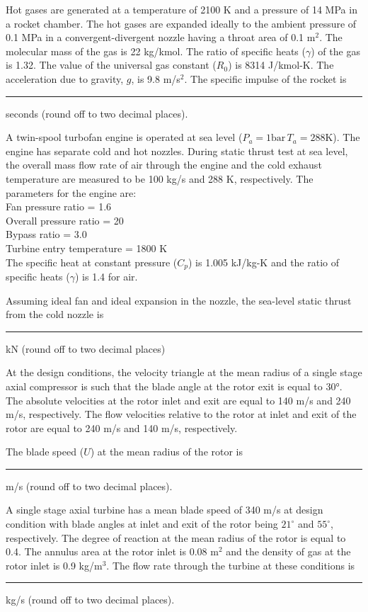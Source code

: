 \item Hot gases are generated at a temperature of 2100 K and a pressure of 14 MPa in a rocket chamber. The hot gases are expanded ideally to the ambient pressure of 0.1 MPa in a convergent-divergent nozzle having a throat area of 0.1 m$^2$. The molecular mass of the gas is 22 kg/kmol. The ratio of specific heats ($\gamma$) of the gas is 1.32. The value of the universal gas constant ($R_0$) is 8314 J/kmol-K. The acceleration due to gravity, $g$, is 9.8 m/s$^2$. The specific impulse of the rocket is \rule{1.5cm}{0.4pt} seconds (round off to two decimal places).

\item A twin-spool turbofan engine is operated at sea level ($P_a = 1 \text{bar}\, T_a = 288 \text{K}$). The engine has separate cold and hot nozzles. During static thrust test at sea level, the overall mass flow rate of air through the engine and the cold exhaust temperature are measured to be 100 kg/s and 288 K, respectively. The parameters for the engine are:\\
    Fan pressure ratio = 1.6\\
    Overall pressure ratio = 20\\
    Bypass ratio = 3.0\\
    Turbine entry temperature = 1800 K\\
The specific heat at constant pressure ($C_p$) is 1.005 kJ/kg-K and the ratio of specific heats ($\gamma$) is 1.4 for air.

Assuming ideal fan and ideal expansion in the nozzle, the sea-level static thrust from the cold nozzle is \rule{1.5cm}{0.4pt}kN (round off to two decimal places)

\item At the design conditions, the velocity triangle at the mean radius of a single stage axial compressor is such that the blade angle at the rotor exit is equal to 30°. The absolute velocities at the rotor inlet and exit are equal to 140 m/s and 240 m/s, respectively. The flow velocities relative to the rotor at inlet and exit of the rotor are equal to 240 m/s and 140 m/s, respectively.



The blade speed (\(U\)) at the mean radius of the rotor is \rule{1.5cm}{0.4pt}m/s (round off to two decimal places).

\item A single stage axial turbine has a mean blade speed of 340 m/s at design condition with blade angles at inlet and exit of the rotor being $21^\circ$ and $55^\circ$, respectively. The degree of reaction at the mean radius of the rotor is equal to 0.4. The annulus area at the rotor inlet is 0.08 m$^2$ and the density of gas at the rotor inlet is 0.9 kg/m$^3$. The flow rate through the turbine at these conditions is \rule{2cm}{0.4pt} kg/s (round off to two decimal places).

